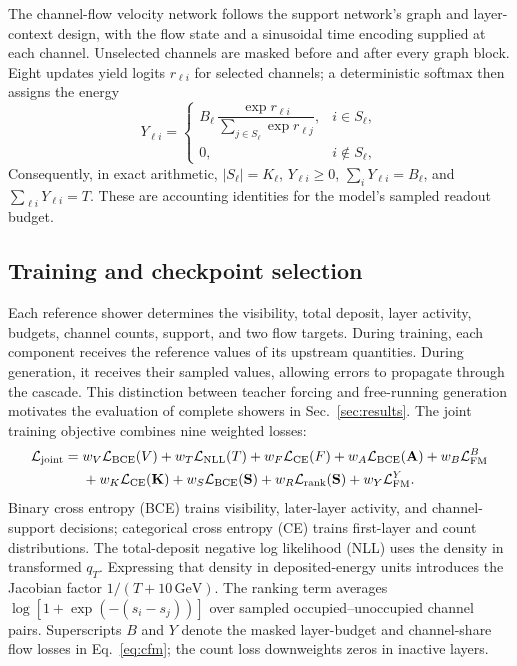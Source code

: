 \documentclass[11pt]{article}
\newcommand{\GeV}{\,\mathrm{GeV}}
\begin{document}
The channel-flow velocity network follows the support network's graph and layer-context design, with the flow state and a sinusoidal time encoding supplied at each channel. Unselected channels are masked before and after every graph block. Eight updates yield logits $r_{\ell i}$ for selected channels; a deterministic softmax then assigns the energy
\begin{equation}
 Y_{\ell i}=
 \begin{cases}
 B_\ell\,\dfrac{\exp r_{\ell i}}{\sum_{j\in S_\ell}\exp r_{\ell j}}, & i\in S_\ell,\\[6pt]
 0, & i\notin S_\ell,
 \end{cases}
 \label{eq:decoder}
\end{equation}
Consequently, in exact arithmetic, $|S_\ell|=K_\ell$, $Y_{\ell i}\geq0$, $\sum_iY_{\ell i}=B_\ell$, and $\sum_{\ell i}Y_{\ell i}=T$. These are accounting identities for the model's sampled readout budget.

\subsection{Training and checkpoint selection}

Each reference shower determines the visibility, total deposit, layer activity, budgets, channel counts, support, and two flow targets. During training, each component receives the reference values of its upstream quantities. During generation, it receives their sampled values, allowing errors to propagate through the cascade. This distinction between teacher forcing and free-running generation motivates the evaluation of complete showers in Sec.~\ref{sec:results}. The joint training objective combines nine weighted losses:
\begin{equation}
 \begin{aligned}
 \mathcal L_{\rm joint}={}&w_V\mathcal L_{\rm BCE}(V)
 +w_T\mathcal L_{\rm NLL}(T)
 +w_F\mathcal L_{\rm CE}(F)
 +w_A\mathcal L_{\rm BCE}(\mathbf A)
 +w_B\mathcal L_{\rm FM}^{B}\\
 &+w_K\mathcal L_{\rm CE}(\mathbf K)
 +w_S\mathcal L_{\rm BCE}(\mathbf S)
 +w_R\mathcal L_{\rm rank}(\mathbf S)
 +w_Y\mathcal L_{\rm FM}^{Y}.
 \end{aligned}
 \label{eq:joint_loss}
\end{equation}
Binary cross entropy (BCE) trains visibility, later-layer activity, and channel-support decisions; categorical cross entropy (CE) trains first-layer and count distributions. The total-deposit negative log likelihood (NLL) uses the density in transformed $q_T$. Expressing that density in deposited-energy units introduces the Jacobian factor $1/(T+10\GeV)$. The ranking term averages $\log[1+\exp(-(s_i-s_j))]$ over sampled occupied--unoccupied channel pairs. Superscripts $B$ and $Y$ denote the masked layer-budget and channel-share flow losses in Eq.~\eqref{eq:cfm}; the count loss downweights zeros in inactive layers.
\end{document}
